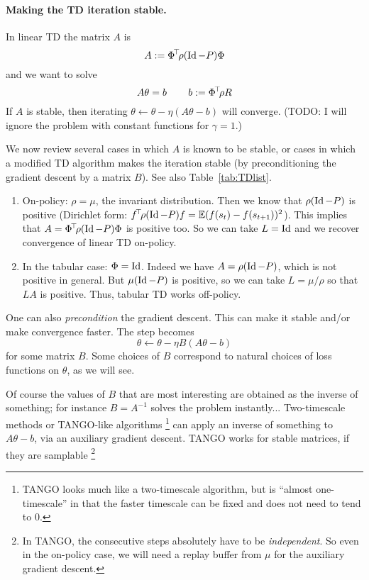 \documentclass[11pt,a4paper]{article}
\begin{document}
\paragraph{Making the TD iteration stable.} In linear TD the matrix $A$ is
\begin{equation}
A\mathrel{\mathop{:}}= \Phi^{\!\top}\!\rho (\operatorname{Id}-P)\Phi
\end{equation}
and we want to solve
\begin{equation}
A\theta=b\,\qquad b\mathrel{\mathop{:}}= \Phi^{\!\top}\!\rho R
\end{equation}
If $A$ is stable, then iterating $\theta\gets \theta -\eta(A\theta-b)$ will
converge. (TODO: I will ignore the problem with constant functions for
$\gamma=1$.)

We now review several cases in which $A$ is known to be stable, or cases
in which a modified TD algorithm makes the iteration stable (by
preconditioning the gradient descent by a matrix $B$). See also
Table~\ref{tab:TDlist}.

\begin{enumerate}
\item On-policy: $\rho=\mu$, the invariant distribution. Then we know that $\rho(\operatorname{Id}-P)$ is positive
(Dirichlet form: $f^{\!\top}\!\rho(\operatorname{Id}-P)f=\mathbb{E}(f(s_t)-f(s_{t+1}))^2$). This implies that $A=\Phi^{\!\top}\!\rho (\operatorname{Id}-P)\Phi$ is
positive too. So we can take $L=\operatorname{Id}$ and we recover convergence of linear
TD on-policy.
\item In the tabular case: $\Phi=\operatorname{Id}$. Indeed we have $A=\rho (\operatorname{Id}-P)$,
which is not positive in general. But $\mu (\operatorname{Id}-P)$ is positive, so we can take
$L=\mu/\rho$ so that $LA$ is positive. Thus, tabular TD works
off-policy.
\end{enumerate}

One can also \emph{precondition} the gradient descent. This can make it
stable and/or make convergence faster. The step becomes
\begin{equation}
\theta\gets \theta-\eta B(A\theta-b)
\end{equation}
for some matrix $B$. Some choices of $B$ correspond to natural choices of
loss functions on $\theta$, as we will see.

Of course the values of $B$ that are most interesting are obtained as the
inverse of something; for instance $B=A^{-1}$ solves the problem
instantly... Two-timescale methods or TANGO-like algorithms
\footnote{TANGO looks much like a two-timescale algorithm, but is
``almost one-timescale'' in that the faster timescale can be fixed and
does not need to tend to $0$.} can apply an
inverse of something to $A\theta-b$, via an auxiliary gradient descent.
TANGO works for stable matrices, if they are samplable \footnote{In
TANGO, the consecutive steps absolutely have to be \emph{independent}. So even in
the on-policy case, we will need a replay buffer from $\mu$ for the auxiliary
gradient descent.}
\end{document}
